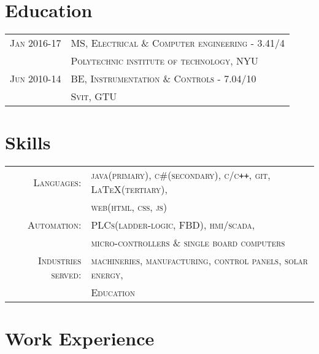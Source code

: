 \documentclass[a4paper]{article}
\begin{document}
\section	{	Education		}
	\begin{tabular}{rl}
		\small{}\textsc{	Jan 2016-17	} 	& 	\textsc{	MS, Electrical \& Computer engineering 		\small { - 3.41/4}		}	\\
 											& 	\textsc{	Polytechnic institute of technology, NYU							}	\\
 		\small{}\textsc{	Jun 2010-14	} 	& 	\textsc{	BE, Instrumentation \small{\&} Controls		\small { - 7.04/10}		}	\\
 											& 	\textsc{	Svit, GTU															}	\\
	\end{tabular}
	\begin{spacing}{0.1}
	\end{spacing}

\section{		Skills																													}
	\begin{tabular}{rl}	\small{}
	 	\small{}\textsc{	Languages:			}	& \textsc{	java(primary), c\#(secondary), c/c\texttt{++}, git, \LaTeX (tertiary),	}	\\
													& \textsc{	web(html, css, js)														} 	\\
 		\small{}\textsc{	Automation:			}	& \textsc{	PLCs(ladder-logic, FBD), hmi/scada,										}	\\
													& \textsc{	micro-controllers \& single board computers								} 	\\
 		\small{}\textsc{	Industries served:	}	& \textsc{	machineries, manufacturing, control panels, solar energy,				}	\\
													& \textsc{	Education																} 	\\
	\end{tabular}
	\begin{spacing}{0.5}
	\end{spacing}

\section	{	Work Experience																										}
%
\end{document}
